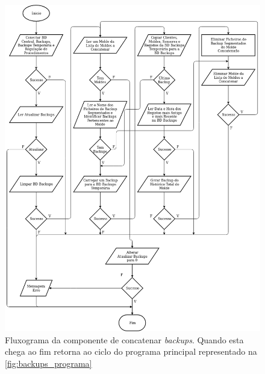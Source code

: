\documentclass[11pt,twoside,a4paper]{report}
\begin{document}
\begin{figure}
	\begin{center}
		\includegraphics[width=1\textwidth]{fluxograma_backups_concatenar03} %
		\caption[Fluxograma da componente de concatenar \textit{backups}]{Fluxograma da componente de concatenar \textit{backups}. Quando esta chega ao fim retorna ao ciclo do programa principal representado na \autoref{fig:backups_programa}}
		\label{fig:backups_concatenar}
	\end{center}
\end{figure}
\end{document}
